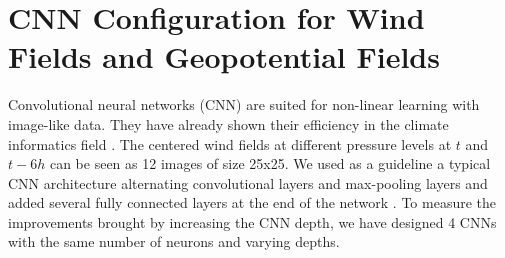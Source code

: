 \section{CNN Configuration for Wind Fields and Geopotential Fields}
Convolutional neural networks (CNN) are suited for non-linear learning with image-like data. They have already shown their efficiency in the climate informatics field \cite{xingjian2015convolutional, de2017deep,racah2017extremeweather}. The centered wind fields at different pressure levels at $t$ and $t-6h$ can be seen as 12 images of size 25x25. We used as a guideline a typical CNN architecture alternating convolutional layers and max-pooling layers and added several fully connected layers at the end of the network \cite{simonyan2014very}. To measure the improvements brought by increasing the CNN depth, we have designed 4 CNNs with the same number of neurons and varying depths. 


